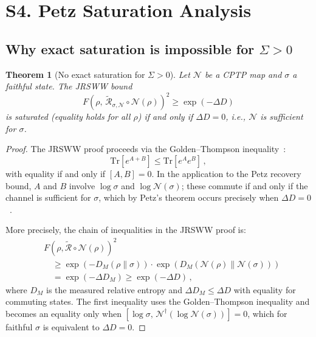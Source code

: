 \documentclass[aps,prd,preprint,superscriptaddress,longbibliography]{revtex4-2}
\newtheorem{theorem}{Theorem}
\newcommand{\Tr}{\mathrm{Tr}}
\newcommand{\Petz}{\mathcal{R}}
\newcommand{\chan}{\mathcal{N}}
\begin{document}
\section{S4. Petz Saturation Analysis}
\label{sec:saturation}

\subsection{Why exact saturation is impossible for $\Sigma > 0$}

\begin{theorem}[No exact saturation for $\Sigma > 0$]
\label{thm:no_saturation}
Let $\chan$ be a CPTP map and $\sigma$ a faithful state.  The JRSWW
bound~\cite{JRSWW2018}
\begin{equation}
  F(\rho,\,\tilde{\Petz}_{\sigma,\chan}\circ\chan(\rho))^2
  \geq \exp(-\Delta D)
  \label{eq:JRSWW}
\end{equation}
is saturated (equality holds for all $\rho$) if and only if
$\Delta D = 0$, i.e., $\chan$ is sufficient for $\sigma$.
\end{theorem}

\begin{proof}
The JRSWW proof proceeds via the Golden--Thompson
inequality~\cite{GoldenThompson1965}:
\begin{equation}
  \Tr[e^{A+B}] \leq \Tr[e^A e^B]\,,
  \label{eq:GT}
\end{equation}
with equality if and only if $[A,B] = 0$.  In the application to the
Petz recovery bound, $A$ and $B$ involve $\log\sigma$ and
$\log\chan(\sigma)$; these commute if and only if the channel is
sufficient for $\sigma$, which by Petz's theorem occurs precisely when
$\Delta D = 0$~\cite{Petz1988}.

More precisely, the chain of inequalities in the JRSWW proof is:
\begin{align}
  &F(\rho,\tilde{\Petz}\circ\chan(\rho))^2
  \nonumber\\
  &\quad\geq \exp\!\left(-D_M(\rho\|\sigma)\right)
  \cdot \exp\!\left(D_M(\chan(\rho)\|\chan(\sigma))\right)
  \nonumber\\
  &\quad= \exp(-\Delta D_M) \geq \exp(-\Delta D)\,,
  \label{eq:chain}
\end{align}
where $D_M$ is the measured relative entropy and
$\Delta D_M \leq \Delta D$ with equality for commuting states.
The first inequality uses the Golden--Thompson inequality and
becomes an equality only when $[\log\sigma,\,
\chan^\dagger(\log\chan(\sigma))] = 0$, which for faithful $\sigma$
is equivalent to $\Delta D = 0$.
\end{proof}
\end{document}
